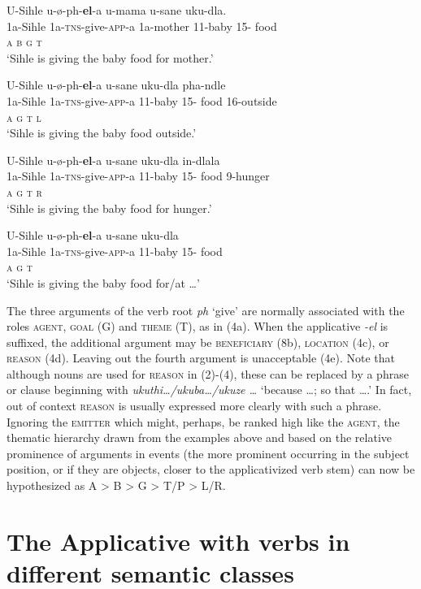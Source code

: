 \documentclass[output=paper]{langsci/langscibook}
\begin{document}
\ex
\gll U-Sihle u-ø-ph-\textbf{el}-a u-mama u-sane uku-dla. \\
 1a-Sihle 1a-\textsc{tns}-give-\textsc{app}-a 1a-mother 11-baby 15- food \\
 \textsc{a b g t }\\
\glt ‘Sihle is giving the baby food for mother.’


\ex
\gll U-Sihle u-ø-ph-\textbf{el}-a u-sane uku-dla pha-ndle \\
 1a-Sihle 1a-\textsc{tns}-give-\textsc{app}-a 11-baby 15- food 16-outside\\
 \textsc{a g t l}\\
\glt ‘Sihle is giving the baby food outside.’


\ex
\gll U-Sihle u-ø-ph-\textbf{el}-a u-sane uku-dla in-dlala \\
 1a-Sihle 1a-\textsc{tns}-give-\textsc{app}-a 11-baby 15- food 9-hunger\\
 \textsc{a g t r }\\
\glt ‘Sihle is giving the baby food for hunger.’

\ex
\gll *U-Sihle u-ø-ph-\textbf{el}-a u-sane uku-dla \\
 1a-Sihle 1a-\textsc{tns}-give-\textsc{app}-a 11-baby 15- food \\
 \textsc{a g t}\\
\glt ‘Sihle is giving the baby food for/at …’
\z
\z


The three arguments of the verb root \textit{ph} ‘give’ are normally associated with the roles \textsc{agent}, \textsc{goal} (G) and \textsc{theme} (T), as in (4a). When the applicative \textit{-el} is suffixed, the additional argument may be \textsc{beneficiary} (8b), \textsc{location} (4c), or \textsc{reason} (4d). Leaving out the fourth argument is unacceptable (4e). Note that although nouns are used for \textsc{reason} in (2)-(4), these can be replaced by a phrase or clause beginning with \textit{ukuthi…/ukuba…/ukuze …} ‘because …; so that ….’ In fact, out of context \textsc{reason} is usually expressed more clearly with such a phrase. Ignoring the \textsc{emitter} which might, perhaps, be ranked high like the \textsc{agent}, the thematic hierarchy drawn from the examples above and based on the relative prominence of arguments in events (the more prominent occurring in the subject position, or if they are objects, closer to the applicativized verb stem) can now be hypothesized as A > B > G > T/P > L/R. 

\section {The Applicative with verbs in different semantic classes}
\end{document}
